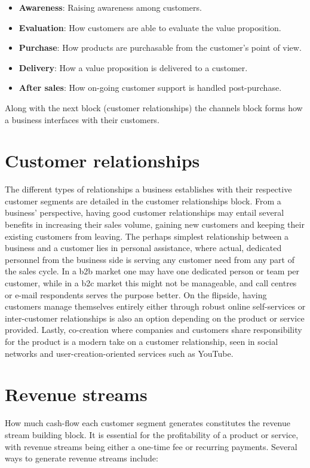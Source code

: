 \begin{itemize}
    \item \textbf{Awareness}: Raising awareness among customers.
    \item \textbf{Evaluation}: How customers are able to evaluate the value proposition.
    \item \textbf{Purchase}: How products are purchasable from the customer's point of view.
    \item \textbf{Delivery}: How a value proposition is delivered to a customer.
    \item \textbf{After sales}: How on-going customer support is handled post-purchase.
\end{itemize}
Along with the next block (customer relationships) the channels block forms how a business interfaces with their customers. 

\section{Customer relationships}
The different types of relationships a business establishes with their respective customer segments are detailed in the customer relationships block. From a business' perspective, having good customer relationships may entail several benefits in increasing their sales volume, gaining new customers and keeping their existing customers from leaving. The perhaps simplest relationship between a business and a customer lies in personal assistance, where actual, dedicated personnel from the business side is serving any customer need from any part of the sales cycle. In a \gls{b2b} market one may have one dedicated person or team per customer, while in a \gls{b2c} market this might not be manageable, and call centres or e-mail respondents serves the purpose better. On the flipside, having customers manage themselves entirely either through robust online self-services or inter-customer relationships is also an option depending on the product or service provided. Lastly, co-creation where companies and customers share responsibility for the product is a modern take on a customer relationship, seen in social networks and user-creation-oriented services such as YouTube.

\section{Revenue streams}
How much cash-flow each customer segment generates constitutes the revenue stream building block. It is essential for the profitability of a product or service, with revenue streams being either a one-time fee or recurring payments. Several ways to generate revenue streams include:

